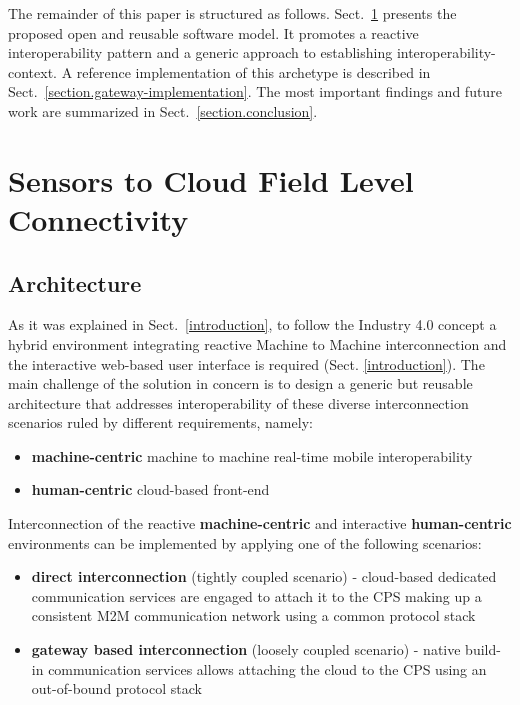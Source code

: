 \documentclass{article}
\begin{document}
The remainder of this paper is structured as follows. Sect.~\ref{cloud-to-sensors-field-level-connectivity} presents the proposed open and reusable software model. It promotes a reactive interoperability pattern and a generic approach to establishing interoperability-context. A reference implementation of this archetype is described in Sect.~\ref{section.gateway-implementation}. The most important findings and future work are summarized in Sect.~\ref{section.conclusion}.

\section{Sensors to Cloud Field Level Connectivity}\label{cloud-to-sensors-field-level-connectivity}

\subsection{Architecture}\label{subs.architecture}

As it was explained in Sect.~\ref{introduction}, to follow the Industry 4.0 concept a hybrid environment integrating reactive Machine to Machine interconnection and the interactive web-based user interface is required (Sect. \ref{introduction}). The main challenge of the solution in concern is to design a generic but reusable architecture that addresses interoperability of these diverse interconnection scenarios ruled by different requirements, namely:

\begin{itemize}
      \item \textbf{machine-centric} machine to machine real-time mobile interoperability
      \item \textbf{human-centric} cloud-based front-end
\end{itemize}

Interconnection of the reactive \textbf{machine-centric} and interactive \textbf{human-centric} environments can be implemented by applying one of the following scenarios:

\begin{itemize}
      \item \textbf{direct interconnection} (tightly coupled scenario) - cloud-based dedicated communication services are engaged to attach it to the CPS making up a consistent M2M communication network using a common protocol stack
      \item \textbf{gateway based interconnection} (loosely coupled scenario) - native build-in communication services allows attaching the cloud to the CPS using an out-of-bound protocol stack
\end{itemize}
\end{document}
